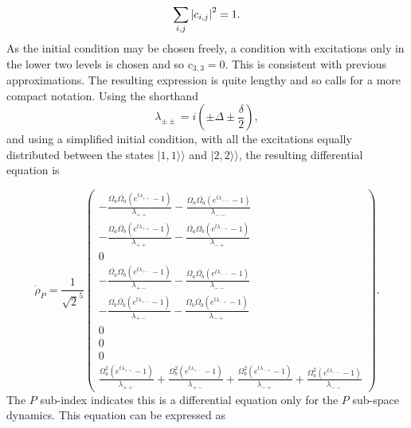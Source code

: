 \documentclass[12pt]{article}
\newcommand{\superket}[1]{|#1\rangle\rangle}
\begin{document}
\begin{equation}
    \sum_{i,j} \abs{c_{i,j}}^2 = 1.
\end{equation} As the initial condition may be chosen freely, a condition with excitations only in the lower two levels is chosen and so $c_{3,3} = 0$. This is consistent with previous approximations. The resulting expression is quite lengthy and so calls for a more compact notation. Using the shorthand $$\lambda_{\pm \pm}=i(\pm \Delta \pm \frac{\delta}{2}),$$ and using a simplified initial condition, with all the excitations equally distributed between the states $\superket{1,1}$ and $\superket{2,2}$, the resulting differential equation is

\begin{equation}
   \dot{\rho}_P = \frac{1}{\sqrt{2}^5}\begin{pmatrix}-\frac{\Omega_a \overline{\Omega_a} \left( {e^{ t { \lambda_{++}}  }}-1\right) }{ { \lambda_{++}}}-\frac{\Omega_a \overline{\Omega_a} \left( {{e}^{ t { \lambda_{--}}  }}-1\right) }{ { \lambda_{--}}}\\
-\frac{\Omega_a\overline{\Omega_b} \left( {{e}^{ t { \lambda_{++}}  }}-1\right)  }{ { \lambda_{++}}}-\frac{\overline{\Omega_a}\Omega_b \left( {{e}^{ t { \lambda_{-+}}  }}-1\right)  }{ { \lambda_{-+}}}\\
0\\
-\frac{\overline{\Omega_a} \Omega_b \left( {{e}^{ t { \lambda_{+-}}  }}-1\right) }{ { \lambda_{+-}}}-\frac{\Omega_a \overline{\Omega_b} \left( {{e}^{ t { \lambda_{--}}  }}-1\right) }{ { \lambda_{--}}}\\
-\frac{\Omega_b \overline{\Omega_b} \left( {{e}^{ t { \lambda_{+-}}  }}-1\right) }{ { \lambda_{+-}}}-\frac{\Omega_b \overline{\Omega_b} \left( {{e}^{ t { \lambda_{-+}}  }}-1\right) }{ { \lambda_{-+}}}\\
0\\
0\\
0\\
\frac{\Omega_a^2 \left( {{e}^{ t { \lambda_{++}}  }}-1\right) }{ { \lambda_{++}}}+\frac{\Omega_b^2\left( {{e}^{ t { \lambda_{+-}}  }}-1\right) }{ { \lambda_{+-}}}+\frac{\Omega_b^2 \left( {{e}^{ t { \lambda_{-+}}  }}-1\right) }{ { \lambda_{-+}}}+\frac{\Omega_a^2\left( {{e}^{ t { \lambda_{--}}  }}-1\right) }{ { \lambda_{--}}}\end{pmatrix}.
\end{equation}The $P$ sub-index indicates this is a differential equation only for the $P$ sub-space dynamics. This equation can be expressed as
\end{document}
